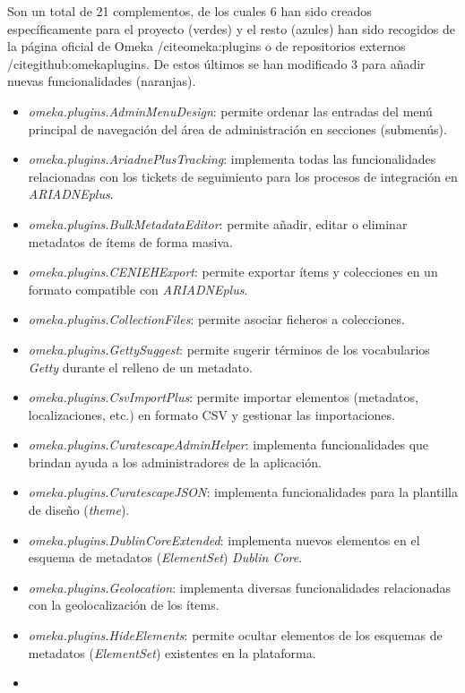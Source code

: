 Son un total de 21 complementos, de los cuales 6 han sido creados
específicamente para el proyecto (verdes) y el resto (azules) han sido
recogidos de la página oficial de Omeka /cite{omeka:plugins} o de repositorios externos /cite{github:omekaplugins}. De
estos últimos se han modificado 3 para añadir nuevas funcionalidades
(naranjas).

\begin{itemize}
\tightlist
\item
  \emph{omeka.plugins.AdminMenuDesign}: permite ordenar las entradas del
  menú principal de navegación del área de administración en secciones
  (submenús).
\item
  \emph{omeka.plugins.AriadnePlusTracking}: implementa todas las
  funcionalidades relacionadas con los tickets de seguimiento para los
  procesos de integración en \emph{ARIADNEplus}.
\item
  \emph{omeka.plugins.BulkMetadataEditor}: permite añadir, editar o
  eliminar metadatos de ítems de forma masiva.
\item
  \emph{omeka.plugins.CENIEHExport}: permite exportar ítems y
  colecciones en un formato compatible con \emph{ARIADNEplus}.
\item
  \emph{omeka.plugins.CollectionFiles}: permite asociar ficheros a
  colecciones.
\item
  \emph{omeka.plugins.GettySuggest}: permite sugerir términos de los
  vocabularios \emph{Getty} durante el relleno de un metadato.
\item
  \emph{omeka.plugins.CsvImportPlus}: permite importar elementos
  (metadatos, localizaciones, etc.) en formato CSV y gestionar las
  importaciones.
\item
  \emph{omeka.plugins.CuratescapeAdminHelper}: implementa
  funcionalidades que brindan ayuda a los administradores de la
  aplicación.
\item
  \emph{omeka.plugins.CuratescapeJSON}: implementa funcionalidades para
  la plantilla de diseño (\emph{theme}).
\item
  \emph{omeka.plugins.DublinCoreExtended}: implementa nuevos elementos
  en el esquema de metadatos (\emph{ElementSet}) \emph{Dublin Core}.
\item
  \emph{omeka.plugins.Geolocation}: implementa diversas funcionalidades
  relacionadas con la geolocalización de los ítems.
\item
  \emph{omeka.plugins.HideElements}: permite ocultar elementos de los
  esquemas de metadatos (\emph{ElementSet}) existentes en la plataforma.
\item

\end{itemize}
